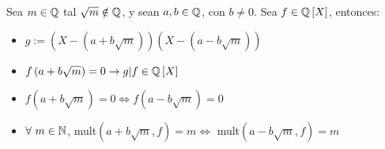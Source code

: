 Sea $m\in\mathbb{Q}$ tal $\sqrt{m}\notin\mathbb{Q}$, y sean  $a,b\in\mathbb{Q}$, con $b\neq0$. Sea $f\in\mathbb{Q}\left[X\right]$, entonces:
\begin{itemize}
    \item $g := \left(X-\left(a+b\sqrt{m}\right)\right)\left(X-\left(a-b\sqrt{m}\right)\right)$
    \item $f\left(a+b\sqrt{m}\right) =0 \to g|f\in\mathbb{Q}\left[X\right]$
    \item $f\left(a+b\sqrt{m}\right) = 0 \iff f\left(a-b\sqrt{m}\right) = 0$
    \item $\forall~m\in\mathbb{N}$, mult$(a+b\sqrt{m}, f) = m\iff $ mult$(a-b\sqrt{m}, f) = m$
\end{itemize}

